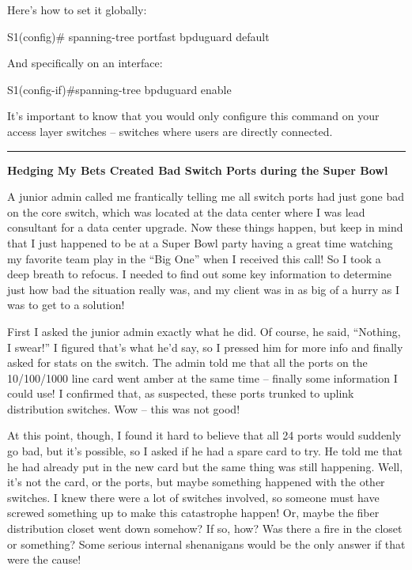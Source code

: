 Here's how to set it globally:

\begin{cli}
S1(config)# spanning-tree portfast bpduguard default
\end{cli}

And specifically on an interface:

\begin{cli}
S1(config-if)#spanning-tree bpduguard enable
\end{cli}

It's important to know that you would only configure this command on
your access layer switches -- switches where users are directly
connected.

\begin{center}\rule{0.5\linewidth}{0.5pt}\end{center}

\textbf{Hedging My Bets Created Bad Switch Ports during the Super Bowl}

A junior admin called me frantically telling me all switch ports had
just gone bad on the core switch, which was located at the data center
where I was lead consultant for a data center upgrade. Now these things
happen, but keep in mind that I just happened to be at a Super Bowl
party having a great time watching my favorite team play in the ``Big
One'' when I received this call! So I took a deep breath to refocus. I
needed to find out some key information to determine just how bad the
situation really was, and my client was in as big of a hurry as I was to
get to a solution!

First I asked the junior admin exactly what he did. Of course, he said,
``Nothing, I swear!'' I figured that's what he'd say, so I pressed him
for more info and finally asked for stats on the switch. The admin told
me that all the ports on the 10/100/1000 line card went amber at the
same time -- finally some information I could use! I confirmed that, as
suspected, these ports trunked to uplink distribution switches.
Wow -- this was not good!

At this point, though, I found it hard to believe that all 24 ports
would suddenly go bad, but it's possible, so I asked if he had a spare
card to try. He told me that he had already put in the new card but the
same thing was still happening. Well, it's not the card, or the ports,
but maybe something happened with the other switches. I knew there were
a lot of switches involved, so someone must have screwed something up to
make this catastrophe happen! Or, maybe the fiber distribution closet
went down somehow? If so, how? Was there a fire in the closet or
something? Some serious internal shenanigans would be the only answer if
that were the cause!

